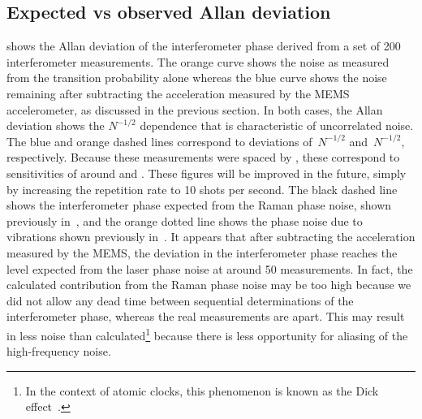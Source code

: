 \subsection{Expected vs observed Allan deviation}\label{subsec:stability}	
 shows the Allan deviation of the
interferometer phase derived from a set of 200 interferometer
measurements. The orange
curve shows the noise as measured from the transition probability
alone whereas the blue curve shows the noise remaining after
subtracting the acceleration measured by the MEMS accelerometer, as
discussed in the previous section. In both
cases, the Allan deviation shows the $N^{-1/2}$ dependence that is
characteristic of uncorrelated noise. The blue and orange dashed
lines correspond to deviations of
\,$N^{-1/2}$ and \,$N^{-1/2}$,
respectively.
Because these measurements were spaced by , these
correspond to sensitivities of around
 and
. These figures will be improved in the future, simply by
increasing the repetition rate to 10 shots per second. The black dashed line shows the interferometer phase
expected from the Raman phase noise, shown previously
in~, and the orange dotted line shows the
phase noise due to vibrations shown previously
in~. It appears that after subtracting the
acceleration measured by the MEMS, the deviation in the interferometer
phase reaches the level expected from the laser phase noise at around
50 measurements. 
In fact, the calculated contribution from the Raman phase noise may be
too high because we did not allow any dead time between sequential
determinations of the interferometer phase, whereas the real
measurements are  apart. This may result in less
noise than calculated\footnote{In the context of atomic clocks, this phenomenon
is known as the Dick effect~\cite{Dick1990}.} because there is less
opportunity for aliasing of the high-frequency noise. 
